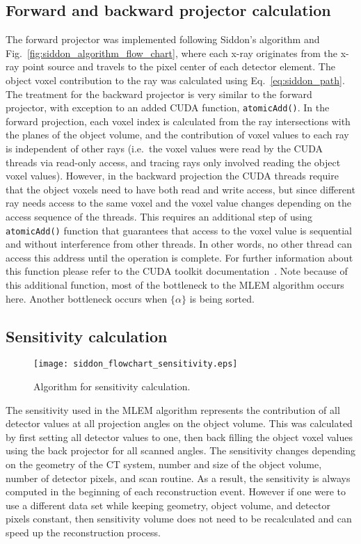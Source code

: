 \subsection{Forward and backward projector calculation}
The forward projector was implemented following Siddon's algorithm and Fig.~\ref{fig:siddon_algorithm_flow_chart}, where each x-ray originates from the x-ray point source and travels to the pixel center of each detector element.  The object voxel contribution to the ray was calculated using Eq.~\ref{eq:siddon_path}.  The treatment for the backward projector is very similar to the forward projector, with exception to an added CUDA function, \texttt{atomicAdd()}.  In the forward projection, each voxel index is calculated from the ray intersections with the planes of the object volume, and the contribution of voxel values to each ray is independent of other rays (i.e.\ the voxel values were read by the CUDA threads via read-only access, and tracing rays only involved reading the object voxel values).  However, in the backward projection the CUDA threads require that the object voxels need to have both read and write access, but since different ray needs access to the same voxel and the voxel value changes depending on the access sequence of the threads.  This requires an additional step of using \texttt{atomicAdd()} function that guarantees that access to the voxel value is sequential and without interference from other threads.  In other words, no other thread can access this address until the operation is complete.  For further information about this function please refer to the CUDA toolkit documentation~\cite{Cudatoolkit}.  Note because of this additional function, most of the bottleneck to the MLEM algorithm occurs here.  Another bottleneck occurs when $\{ \alpha \}$ is being sorted.

\subsection{Sensitivity calculation}

\begin{figure}[h]
\centering
\texttt{[image: siddon\_flowchart\_sensitivity.eps]}
\caption{Algorithm for sensitivity calculation.}
\label{fig:sensitivityslices}
\end{figure}

The sensitivity used in the MLEM algorithm represents the contribution of all detector values at all projection angles on the object volume.  This was calculated by first setting all detector values to one, then back filling the object voxel values using the back projector for all scanned angles.  The sensitivity changes depending on the geometry of the CT system, number and size of the object volume, number of detector pixels, and scan routine.  As a result, the sensitivity is always computed in the beginning of each reconstruction event.  However if one were to use a different data set while keeping geometry, object volume, and detector pixels constant, then sensitivity volume does not need to be recalculated and can speed up the reconstruction process.

